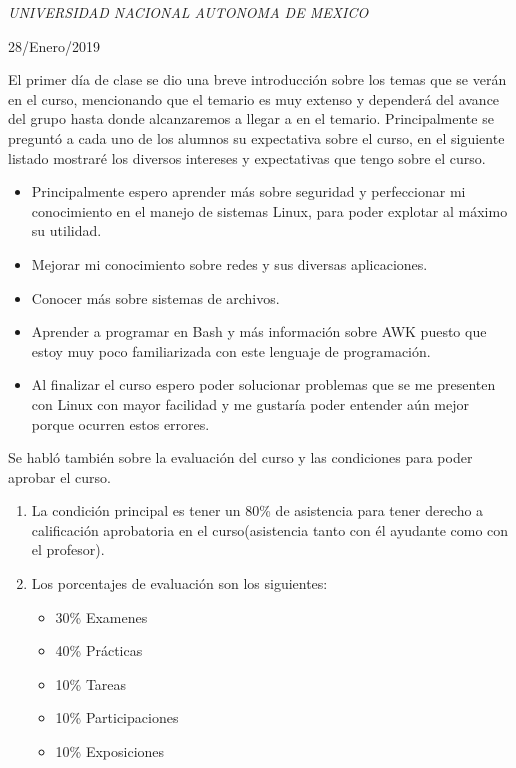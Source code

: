 \documentclass[a4paper, 11pt, oneside]{article}
\begin{document}
\begin{titlepage}
	\textit{UNIVERSIDAD NACIONAL AUTONOMA DE MEXICO} 
	
	\vfill
	
	
	
	
	\vspace{0.3\baselineskip} 
	
	28/Enero/2019 
	
	 

\end{titlepage}

El primer día de clase se dio una breve introducción sobre los temas que se verán en el curso, mencionando que el temario es muy extenso y dependerá del avance del grupo hasta donde alcanzaremos a llegar a en el temario. Principalmente se preguntó a cada uno de los alumnos su expectativa sobre el curso, en el siguiente listado mostraré los diversos intereses y expectativas que tengo sobre el curso.

\begin{itemize}
 \item Principalmente espero aprender más sobre seguridad y perfeccionar mi conocimiento en el manejo de sistemas Linux, para poder explotar al máximo su utilidad.
 \item Mejorar mi conocimiento sobre redes y sus diversas aplicaciones.
 \item Conocer más sobre sistemas de archivos.
 \item Aprender a programar en Bash y más información sobre AWK puesto que estoy muy poco familiarizada con este lenguaje de programación.
 \item Al finalizar el curso espero poder solucionar problemas que se me presenten con Linux con mayor facilidad y me gustaría poder entender aún mejor porque ocurren estos errores.
\end{itemize}

Se habló también sobre la evaluación del curso y las condiciones para poder aprobar el curso.

\begin{enumerate}
 \item La condición principal es tener un 80\% de asistencia para tener derecho a calificación aprobatoria en el curso(asistencia tanto con él ayudante como con el profesor).
 \item Los porcentajes de evaluación son los siguientes:
 \begin{itemize}
  \item 30\% Examenes
  \item 40\% Prácticas
  \item 10\% Tareas 
  \item 10\% Participaciones
  \item 10\% Exposiciones
 \end{itemize}
\end{enumerate}
\end{document}
